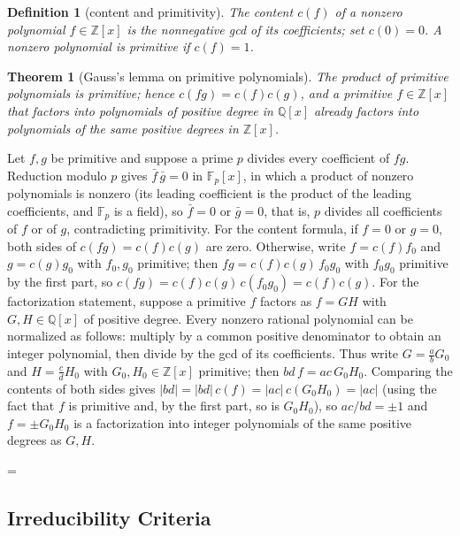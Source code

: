 \documentclass[11pt]{article}
\makeatletter
\theoremstyle{ntstyle}
\newtheorem{theorem}{Theorem}[subsection]
\newtheorem{definition}{Definition}[subsection]
\let\nt@closedisplay\]
\def\nt@guardedclose{\@ifnextchar\par{\nt@closeafterpar}{\@ifnextchar\end{\postdisplaypenalty\@M\nt@closedisplay}{\nt@closedisplay}}}
\def\nt@closeafterpar\par{\@ifnextchar\par{\nt@closeafterpar}{\@ifnextchar\end{\postdisplaypenalty\@M\nt@closedisplay\par}{\nt@closedisplay\par}}}
\renewenvironment{proof}[1][\proofname]{\par
  \pushQED{\qed}\normalfont\topsep\medskipamount\edef\nt@afterproof{\@endparpenalty=\the\@endparpenalty\relax}\@beginparpenalty\@M\@endparpenalty\@M\let\]\nt@guardedclose\trivlist\item[]\textit{#1\@addpunct{.}} \ignorespaces}{\ifvmode\addpenalty\@M\fi\popQED\nt@afterproof\endtrivlist\@endpefalse}
\makeatother
\begin{document}
\begin{definition}[content and primitivity]\label{def:11.2.1} The
	content $c(f)$ of a nonzero polynomial $f\in\mathbb{Z}[x]$ is the nonnegative gcd of its coefficients; set $c(0)=0$. A nonzero polynomial is primitive if $c(f)=1$.

\end{definition}
\begin{theorem}[Gauss's lemma on primitive polynomials]\label{thm:11.2.1} The product of
	primitive polynomials is primitive; hence $c(fg)=c(f)c(g)$, and a
	primitive $f\in\mathbb{Z}[x]$ that factors into polynomials of
	positive degree in $\mathbb{Q}[x]$ already factors into polynomials
	of the same positive degrees in $\mathbb{Z}[x]$.

\end{theorem}

\begin{proof} Let $f,g$ be primitive and suppose a prime
	$p$ divides every coefficient of $fg$. Reduction modulo $p$ gives $\bar f\,\bar g
		= 0$ in $\mathbb{F}_p[x]$, in which a product of nonzero polynomials is
	nonzero (its leading coefficient is the product of the leading
	coefficients, and $\mathbb{F}_p$ is a field), so $\bar f = 0$ or
	$\bar g = 0$, that is, $p$ divides all coefficients of $f$ or of $g$,
	contradicting primitivity. For the content formula, if $f=0$ or $g=0$,
	both sides of $c(fg)=c(f)c(g)$ are zero. Otherwise, write $f = c(f)f_0$
	and $g = c(g)g_0$ with $f_0, g_0$
	primitive; then $fg = c(f)c(g)\,f_0g_0$ with $f_0g_0$ primitive by the
	first part, so $c(fg) = c(f)c(g)\,c(f_0g_0) = c(f)c(g)$. For the
	factorization statement, suppose a
	primitive $f$ factors as $f=GH$ with $G,H\in\mathbb{Q}[x]$ of
	positive degree. Every nonzero rational polynomial can be normalized as follows: multiply by a common positive denominator to obtain an integer polynomial, then divide by the gcd of its coefficients. Thus write $G=\tfrac{a}{b}G_0$ and $H=\tfrac{c}{d}H_0$ with $G_0,H_0\in\mathbb{Z}[x]$ primitive; then $bd\,f=ac\,G_0H_0$.
	Comparing the contents of both sides gives
	$|bd|=|bd|\,c(f)=|ac|\,c(G_0H_0)=|ac|$ (using the fact that $f$ is primitive
	and, by the first part, so is $G_0H_0$), so $ac/bd=\pm1$ and $f=\pm
		G_0H_0$ is a factorization into integer polynomials of the same
	positive degrees as $G,H$.

\end{proof}
\subsection{Irreducibility Criteria}
\end{document}
